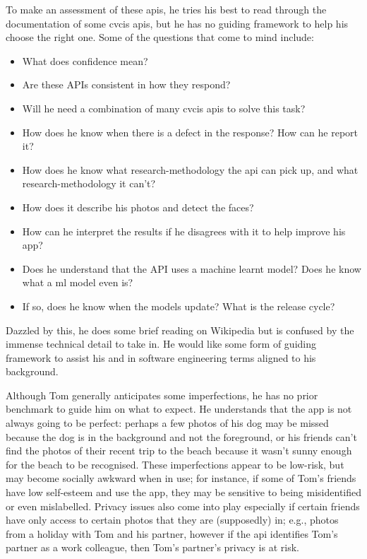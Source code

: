 

To make an assessment of these \glspl{api}, he tries his best to read through the documentation of some \gls{cvcis} \glspl{api}, but he has no guiding framework to help his choose the right one. Some of the questions that come to mind include:

\begin{itemize}
  \item What does confidence mean? 
  \item Are these APIs consistent in how they respond?
  \item Will he need a combination of many \gls{cvcis} \glspl{api} to solve this task?
  \item How does he know when there is a defect in the response? How can he report it?
  \item How does he know what research-methodology the \gls{api} can pick up, and what research-methodology it can't?
  \item How does it describe his photos and detect the faces?
  \item How can he interpret the results if he disagrees with it to help improve his app?
  \item Does he understand that the API uses a machine learnt model? Does he know what a \gls{ml} model even is?
  \item If so, does he know when the models update? What is the release cycle?
\end{itemize}

Dazzled by this, he does some brief reading on Wikipedia but is confused by the immense technical detail to take in. He would like some form of guiding framework to assist his and in software engineering terms aligned to his background.

Although Tom generally anticipates some imperfections, he has no prior benchmark to guide him on what to expect. He understands that the app is not always going to be perfect: perhaps a few photos of his dog may be missed because the dog is in the background and not the foreground, or his friends can't find the photos of their recent trip to the beach because it wasn't sunny enough for the beach to be recognised. These imperfections appear to be low-risk, but may become socially awkward when in use; for instance, if some of Tom's friends have low self-esteem and use the app, they may be sensitive to being misidentified or even mislabelled. Privacy issues also come into play especially if certain friends have only access to certain photos that they are (supposedly) in; e.g., photos from a holiday with Tom and his partner, however if the \gls{api} identifies Tom's partner as a work colleague, then Tom's partner's privacy is at risk.


